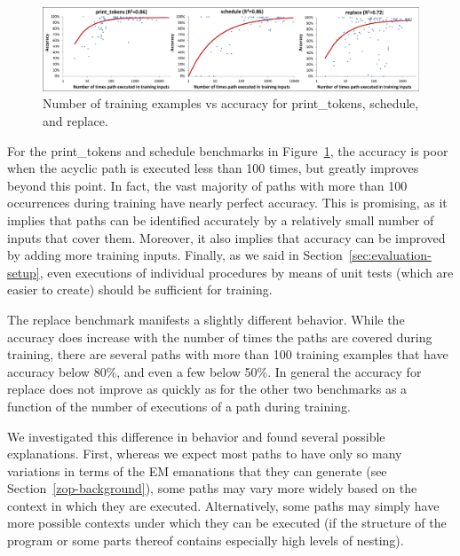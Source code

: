 \begin{figure}[bt]
\includegraphics[width=\textwidth]{../issta_profile/profiling/figures/all_benchmarks}
\caption{Number of training examples vs accuracy for print\_tokens, schedule, and replace.}
\label{fig:all_benchmarks}
\end{figure}

For the print\_tokens and schedule benchmarks in Figure~\ref{fig:all_benchmarks}, the accuracy is poor when the acyclic path is executed less than 100 times, but greatly improves beyond this point.  In fact, the vast majority of paths with more than 100 occurrences during training have nearly perfect accuracy.  This is promising, as it implies that paths can be identified accurately by a relatively small number of inputs that cover them. Moreover, it also implies that accuracy can be improved by adding more training inputs.  Finally, as we said in Section~\ref{sec:evaluation-setup}, even executions of individual procedures by means of unit tests (which are easier to create) should be sufficient for training.

The replace benchmark manifests a slightly different behavior. While the accuracy does increase with the number of times the paths are covered during training, there are several paths with more than 100 training examples that have accuracy below 80\%, and even a few below 50\%. In general the accuracy for replace does not improve as quickly as for the other two benchmarks as a function of the number of executions of a path during training.

We investigated this difference in behavior and found several possible explanations. First, whereas we expect most paths to have only so many variations in terms of the EM emanations that they can generate (see Section~\ref{zop-background}), some paths may vary more widely based on the context in which they are executed. Alternatively, some paths may simply have more possible contexts under which they can be executed (\eg if the structure of the program or some parts thereof contains especially high levels of nesting).

